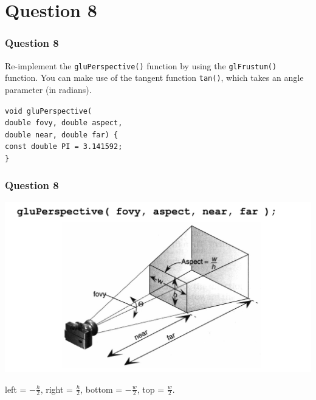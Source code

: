 \documentclass{beamer}
\newcommand\tab[1][0.3cm]{\hspace*{#1}}
\begin{document}
\section{Question 8}

\begin{frame}
    \frametitle{Question 8}
    Re-implement the \texttt{gluPerspective()} function by using the 
    \texttt{glFrustum()} function. You can make use of the tangent function 
    \texttt{tan()}, which takes an angle parameter (in radians). 

    \begin{tcolorbox}
        \small
        \texttt{void gluPerspective(\\
            \tab \tab double fovy, double aspect, \\
            \tab \tab double near, double far) \{ \\
            \tab const double PI = 3.141592;\\
        \}}
    \end{tcolorbox}
\end{frame}

\begin{frame}
    \frametitle{Question 8}

    \begin{center}
        \includegraphics[scale=0.3]{gluPerspective.png}
    \end{center}

    left = $-\frac{h}{2}$, right = $\frac{h}{2}$, bottom = $-\frac{w}{2}$, top = $\frac{w}{2}$.\\

\end{frame}
\end{document}
